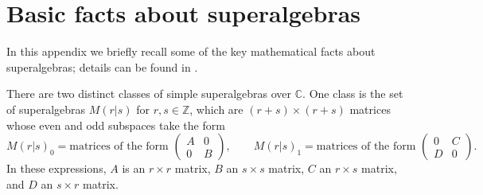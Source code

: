 \documentclass[12pt,a4paper]{article}
\newcommand{\zz}{\mathbb{Z}}
\newcommand{\cc}{\mathbb{C}}
\newcommand\be            {\begin{equation}}
\newcommand\ee            {\end{equation}}
\newcommand{\PsiEnd}{\mathord{\vcenter{\hbox{\texttt{[image: PsiEnd.pdf]}}}}}
\newcommand{\PsiEndExchange}{\mathord{\vcenter{\hbox{\texttt{[image: PsiEndExchange.pdf]}}}}}
\begin{document}

\section{Basic facts about superalgebras} \label{superstuff}

In this appendix we briefly recall some of the key mathematical facts about superalgebras; details can be found in \cite{jozefiak1988}.

There are two distinct classes of simple superalgebras over $\cc$. One class is the set of superalgebras $M(r|s)$ for $r,s\in\zz$, which are $(r+s)\times(r+s)$ matrices whose even and odd subspaces take the form
\be M(r|s)_0 = \text{matrices of the form\ } \begin{pmatrix} A & 0 \\ 0 & B \end{pmatrix},\qquad M(r|s)_1 = \text{matrices of the form\ } \begin{pmatrix} 0 & C \\ D & 0 \end{pmatrix}.\ee
In these expressions, $A$ is an $r\times r$ matrix, $B$ an $s\times s$ matrix, $C$ an $r\times s$ matrix, and $D$ an $s\times r$ matrix. 
\end{document}
